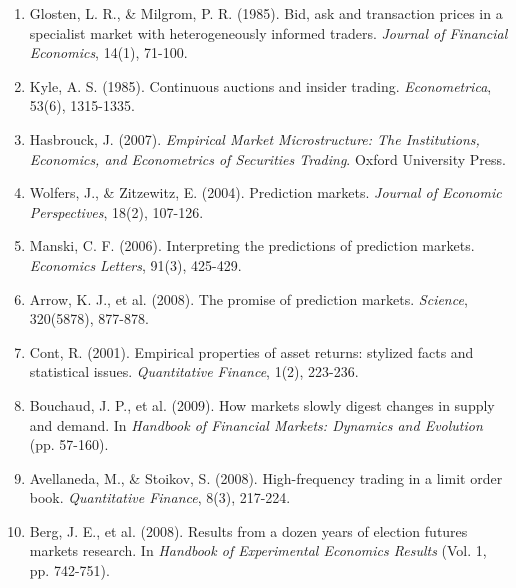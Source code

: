 \documentclass[11pt, a4paper]{report}
\begin{document}
\begin{enumerate}[leftmargin=*]
    \item Glosten, L. R., \& Milgrom, P. R. (1985). Bid, ask and transaction prices in a specialist market with heterogeneously informed traders. \textit{Journal of Financial Economics}, 14(1), 71-100.

    \item Kyle, A. S. (1985). Continuous auctions and insider trading. \textit{Econometrica}, 53(6), 1315-1335.

    \item Hasbrouck, J. (2007). \textit{Empirical Market Microstructure: The Institutions, Economics, and Econometrics of Securities Trading}. Oxford University Press.

    \item Wolfers, J., \& Zitzewitz, E. (2004). Prediction markets. \textit{Journal of Economic Perspectives}, 18(2), 107-126.

    \item Manski, C. F. (2006). Interpreting the predictions of prediction markets. \textit{Economics Letters}, 91(3), 425-429.

    \item Arrow, K. J., et al. (2008). The promise of prediction markets. \textit{Science}, 320(5878), 877-878.

    \item Cont, R. (2001). Empirical properties of asset returns: stylized facts and statistical issues. \textit{Quantitative Finance}, 1(2), 223-236.

    \item Bouchaud, J. P., et al. (2009). How markets slowly digest changes in supply and demand. In \textit{Handbook of Financial Markets: Dynamics and Evolution} (pp. 57-160).

    \item Avellaneda, M., \& Stoikov, S. (2008). High-frequency trading in a limit order book. \textit{Quantitative Finance}, 8(3), 217-224.

    \item Berg, J. E., et al. (2008). Results from a dozen years of election futures markets research. In \textit{Handbook of Experimental Economics Results} (Vol. 1, pp. 742-751).
\end{enumerate}
\end{document}
